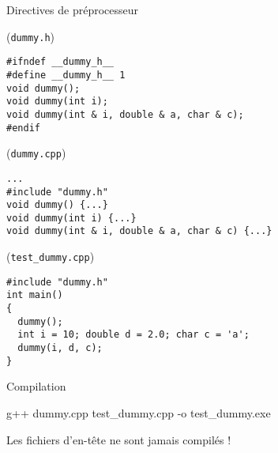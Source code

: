 \documentclass[c]{beamer}
\begin{document}
\begin{frame}[fragile]{}
 \begin{cbox}[6][lotuc][\centering][9][14]
Directives de préprocesseur
\end{cbox}

\begin{cbox}[][lwuc](\texttt{dummy.h})
\begin{verbatim}
#ifndef __dummy_h__
#define __dummy_h__ 1
void dummy();
void dummy(int i);
void dummy(int & i, double & a, char & c);
#endif
\end{verbatim}

\vspace{-0.7cm}
\end{cbox}

\begin{cbox}[][lwuc](\texttt{dummy.cpp})
\begin{verbatim}
...
#include "dummy.h"
void dummy() {...}
void dummy(int i) {...}
void dummy(int & i, double & a, char & c) {...}
\end{verbatim}

\vspace{-0.7cm}
\end{cbox}

\begin{cbox}[][lwuc](\texttt{test\_dummy.cpp})
\begin{verbatim}
#include "dummy.h"
int main()
{
  dummy();
  int i = 10; double d = 2.0; char c = 'a';
  dummy(i, d, c);
}
\end{verbatim}
\end{cbox}
\end{frame}



\begin{frame}{Compilation}
\begin{prompt}
g++ dummy.cpp test\_dummy.cpp -o test\_dummy.exe
\end{prompt}

\begin{cbox}[][][\centering]
 Les fichiers d'en-tête ne sont jamais compilés !
\end{cbox}
\end{frame}
\end{document}
